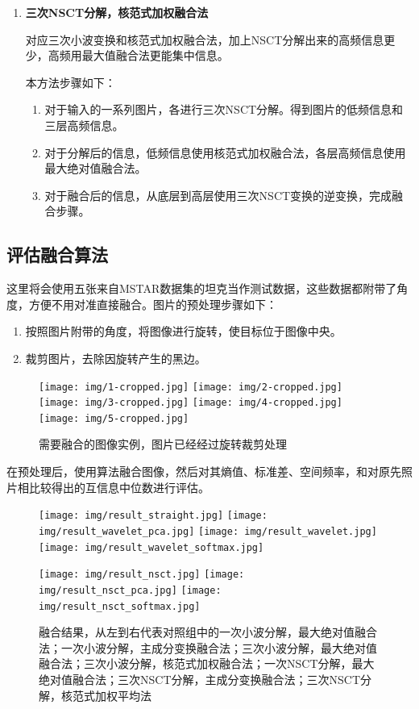 \documentclass{xduugthesis}
\begin{document}
\begin{enumerate}
\item \textbf{三次NSCT分解，核范式加权融合法}\par
对应三次小波变换和核范式加权融合法，加上NSCT分解出来的高频信息更少，高频用最大值融合法更能集中信息。\par
本方法步骤如下：
\begin{enumerate}
	\item 对于输入的一系列图片，各进行三次NSCT分解。得到图片的低频信息和三层高频信息。
	\item 对于分解后的信息，低频信息使用核范式加权融合法，各层高频信息使用最大绝对值融合法。
	\item 对于融合后的信息，从底层到高层使用三次NSCT变换的逆变换，完成融合步骤。
\end{enumerate}
\end{enumerate}
\subsection{评估融合算法}
这里将会使用五张来自MSTAR数据集的坦克当作测试数据，这些数据都附带了角度，方便不用对准直接融合。图片的预处理步骤如下：
\begin{enumerate}
	\item 按照图片附带的角度，将图像进行旋转，使目标位于图像中央。
	\item 裁剪图片，去除因旋转产生的黑边。
\end{enumerate}
\begin{figure}[h!]
	\centering
	\texttt{[image: img/1-cropped.jpg]}
	\texttt{[image: img/2-cropped.jpg]}
	\texttt{[image: img/3-cropped.jpg]}
	\texttt{[image: img/4-cropped.jpg]}
	\texttt{[image: img/5-cropped.jpg]}
	\caption{需要融合的图像实例，图片已经经过旋转裁剪处理}
\end{figure}\par
在预处理后，使用算法融合图像，然后对其熵值、标准差、空间频率，和对原先照片相比较得出的互信息中位数进行评估。
\begin{figure}[h!]
	\centering
	\texttt{[image: img/result\_straight.jpg]}
	\texttt{[image: img/result\_wavelet\_pca.jpg]}
	\texttt{[image: img/result\_wavelet.jpg]}
	\texttt{[image: img/result\_wavelet\_softmax.jpg]}\par
	\texttt{[image: img/result\_nsct.jpg]}
	\texttt{[image: img/result\_nsct\_pca.jpg]}
	\texttt{[image: img/result\_nsct\_softmax.jpg]}
	\caption{融合结果，从左到右代表对照组中的一次小波分解，最大绝对值融合法；一次小波分解，主成分变换融合法；三次小波分解，最大绝对值融合法；三次小波分解，核范式加权融合法；一次NSCT分解，最大绝对值融合法；三次NSCT分解，主成分变换融合法；三次NSCT分解，核范式加权平均法}
\end{figure}
\end{document}
